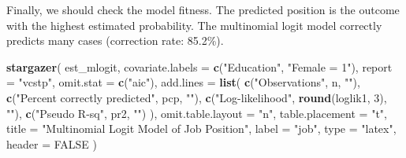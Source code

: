 \documentclass[
  12pt,
]{article}
\newenvironment{Shaded}{\begin{snugshade}}{\end{snugshade}}
\newcommand{\DataTypeTok}[1]{\textcolor[rgb]{0.13,0.29,0.53}{#1}}
\newcommand{\DecValTok}[1]{\textcolor[rgb]{0.00,0.00,0.81}{#1}}
\newcommand{\KeywordTok}[1]{\textcolor[rgb]{0.13,0.29,0.53}{\textbf{#1}}}
\newcommand{\NormalTok}[1]{#1}
\newcommand{\OtherTok}[1]{\textcolor[rgb]{0.56,0.35,0.01}{#1}}
\newcommand{\StringTok}[1]{\textcolor[rgb]{0.31,0.60,0.02}{#1}}
\begin{document}
Finally, we should check the model fitness. The predicted position is
the outcome with the highest estimated probability. The multinomial
logit model correctly predicts many cases (correction rate: 85.2\%).

\begin{Shaded}
\begin{Highlighting}[]
\KeywordTok{stargazer}\NormalTok{(}
\NormalTok{  est\_mlogit,}
  \DataTypeTok{covariate.labels =} \KeywordTok{c}\NormalTok{(}\StringTok{"Education"}\NormalTok{, }\StringTok{"Female = 1"}\NormalTok{),}
  \DataTypeTok{report =} \StringTok{"vcstp"}\NormalTok{, }\DataTypeTok{omit.stat =} \KeywordTok{c}\NormalTok{(}\StringTok{"aic"}\NormalTok{),}
  \DataTypeTok{add.lines =} \KeywordTok{list}\NormalTok{(}
    \KeywordTok{c}\NormalTok{(}\StringTok{"Observations"}\NormalTok{, n, }\StringTok{""}\NormalTok{),}
    \KeywordTok{c}\NormalTok{(}\StringTok{"Percent correctly predicted"}\NormalTok{, pcp, }\StringTok{""}\NormalTok{),}
    \KeywordTok{c}\NormalTok{(}\StringTok{"Log{-}likelihood"}\NormalTok{, }\KeywordTok{round}\NormalTok{(loglik1, }\DecValTok{3}\NormalTok{), }\StringTok{""}\NormalTok{),}
    \KeywordTok{c}\NormalTok{(}\StringTok{"Pseudo R{-}sq"}\NormalTok{, pr2, }\StringTok{""}\NormalTok{)}
\NormalTok{  ),}
  \DataTypeTok{omit.table.layout =} \StringTok{"n"}\NormalTok{, }\DataTypeTok{table.placement =} \StringTok{"t"}\NormalTok{,}
  \DataTypeTok{title =} \StringTok{"Multinomial Logit Model of Job Position"}\NormalTok{,}
  \DataTypeTok{label =} \StringTok{"job"}\NormalTok{,}
  \DataTypeTok{type =} \StringTok{"latex"}\NormalTok{, }\DataTypeTok{header =} \OtherTok{FALSE}  
\NormalTok{)}
\end{Highlighting}
\end{Shaded}
\end{document}
